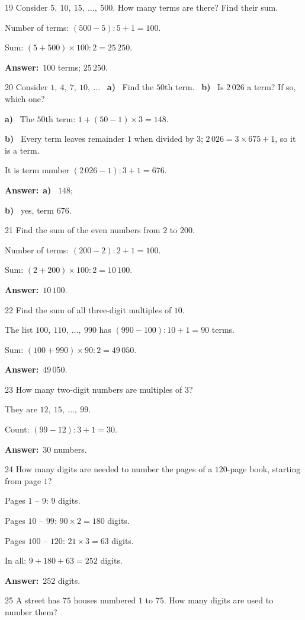 \documentclass[11pt]{article}
\newif\ifsol \solfalse
\providecommand{\AnsWord}{Đáp số}
\newcommand{\dapso}[1]{\par\textbf{\AnsWord:}\ #1}
\newcommand{\probsol}[1]{%
  \begin{lrbox}{\solmeasure}\begin{minipage}{\dimexpr\linewidth-24pt\relax}#1\end{minipage}\end{lrbox}%
  \ifsol
    \begin{solbox}#1\end{solbox}%
  \else
    \setlength{\solht}{\dimexpr\ht\solmeasure+\dp\solmeasure+0.85cm\relax}%
    \ifdim\solht<1.35cm\setlength{\solht}{1.35cm}\fi
    \begin{tcolorbox}[colback=white,colframe=Line,boxrule=0.8pt,arc=5pt,
      left=8pt,right=8pt,top=4pt,bottom=4pt,height=\solht]{\footnotesize\color{Slate}\itshape\WorkWord}\end{tcolorbox}%
  \fi}
\newcommand{\pa}[1]{\textbf{#1)}\ }
\newcommand{\gap}{\vspace{0.3cm}}
\def\WorkWord{Your work:}
\def\AnsWord{Answer}
\begin{document}
\gap
\begin{probbox}{19}{\relax}
Consider $5,\ 10,\ 15,\ \dots,\ 500$. How many terms are there? Find their sum.
\end{probbox}
\probsol{
Number of terms: $(500-5):5+1=100$.\par Sum: $(5+500)\times100:2=25\,250$.
\dapso{$100$ terms; $25\,250$.}}
\gap
\begin{probbox}{20}{\relax}
Consider $1,\ 4,\ 7,\ 10,\ \dots$ \ \pa{a} Find the $50$th term. \ \pa{b} Is $2\,026$ a term? If so, which one?
\end{probbox}
\probsol{
\pa{a} The $50$th term: $1+(50-1)\times3=148$.\par
\pa{b} Every term leaves remainder $1$ when divided by $3$; $2\,026=3\times675+1$, so it is a term.\par It is term number $(2\,026-1):3+1=676$.
\dapso{\pa{a} $148$;\par \pa{b} yes, term $676$.}}
\gap
\begin{probbox}{21}{\relax}
Find the sum of the even numbers from $2$ to $200$.
\end{probbox}
\probsol{
Number of terms: $(200-2):2+1=100$.\par Sum: $(2+200)\times100:2=10\,100$.
\dapso{$10\,100$.}}
\gap
\begin{probbox}{22}{\relax}
Find the sum of all three-digit multiples of $10$.
\end{probbox}
\probsol{
The list $100,\ 110,\ \dots,\ 990$ has $(990-100):10+1=90$ terms.\par Sum: $(100+990)\times90:2=49\,050$.
\dapso{$49\,050$.}}
\gap
\begin{probbox}{23}{\relax}
How many two-digit numbers are multiples of $3$?
\end{probbox}
\probsol{
They are $12,\ 15,\ \dots,\ 99$.\par Count: $(99-12):3+1=30$.
\dapso{$30$ numbers.}}
\gap
\begin{probbox}{24}{\relax}
How many digits are needed to number the pages of a $120$-page book, starting from page $1$?
\end{probbox}
\probsol{
Pages $1$ -- $9$: $9$ digits.\par Pages $10$ -- $99$: $90\times2=180$ digits.\par Pages $100$ -- $120$: $21\times3=63$ digits.\par In all: $9+180+63=252$ digits.
\dapso{$252$ digits.}}
\gap
\begin{probbox}{25}{\relax}
A street has $75$ houses numbered $1$ to $75$. How many digits are used to number them?
\end{probbox}
\end{document}
